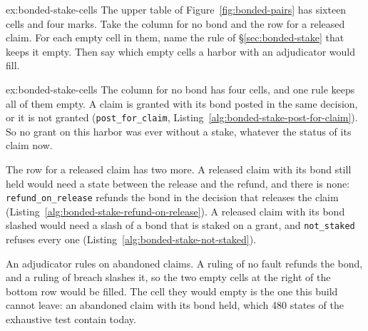 \documentclass[11pt,a4paper]{article}
\theoremstyle{definition}
\theoremstyle{remark}
\begin{document}
\begin{pdexercise}[kind=Check,rating=1]{ex:bonded-stake-cells}
The upper table of Figure~\ref{fig:bonded-pairs} has sixteen cells and four marks. Take the column for no bond and the row for a released claim. For each empty cell in them, name the rule of \S\ref{sec:bonded-stake} that keeps it empty. Then say which empty cells a harbor with an adjudicator would fill.
\end{pdexercise}
\begin{pdsolution}{ex:bonded-stake-cells}
The column for no bond has four cells, and one rule keeps all of them empty. A claim is granted with its bond posted in the same decision, or it is not granted (\texttt{post\_for\_claim}, Listing~\ref{alg:bonded-stake-post-for-claim}). So no grant on this harbor was ever without a stake, whatever the status of its claim now.

The row for a released claim has two more. A released claim with its bond still held would need a state between the release and the refund, and there is none: \texttt{refund\_on\_release} refunds the bond in the decision that releases the claim (Listing~\ref{alg:bonded-stake-refund-on-release}). A released claim with its bond slashed would need a slash of a bond that is staked on a grant, and \texttt{not\_staked} refuses every one (Listing~\ref{alg:bonded-stake-not-staked}).

An adjudicator rules on abandoned claims. A ruling of no fault refunds the bond, and a ruling of breach slashes it, so the two empty cells at the right of the bottom row would be filled. The cell they would empty is the one this build cannot leave: an abandoned claim with its bond held, which 480 states of the exhaustive test contain today.
\end{pdsolution}
\end{document}
